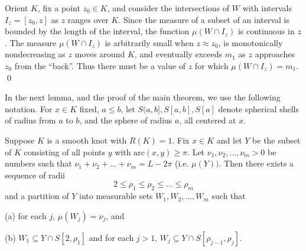 \documentclass{elsart}
\begin{document}
\begin{pf} 
Orient $K$, fix a point $z_0 \in K$, and
consider the intersections of $W$ with intervals
 $I_z =[z_0,z]$ as $z$ ranges over $K$.  
Since the measure of a subset of an 
interval is bounded by the length of the interval,
the function
$\mu(W\cap I_z)$ is continuous in $z$. 
The
measure $\mu(W\cap I_z)$ is arbitrarily small when
$z \approx z_0$, is monotonically
nondecreasing as $z$ moves around $K$, and
eventually exceeds $m_1$ as $z$ approaches $z_0$
from the ``back''.  
Thus there must be a value of $z$
for which $\mu(W\cap I_z) = m_1$. 
\qed
\end{pf}

In the next lemma, and the proof of the main theorem, we
use the following notation.
For $x\in K$ fixed, $a \leq b$, let $S(a,b], S[a,b], S[a]
$ denote spherical shells of radius from $a$ to $b$, and
the sphere of radius $a$, all centered at $x$. 

\begin{lem}
\label{ConstructWj}
Suppose $K$ is a smooth knot with $R(K)=1$.
Fix $x \in K$ and let $Y$ be the subset of $K$ consisting
of all points $y$ with $\mathrm{arc}(x,y) \geq \pi$. 
Let $\nu_1 ,\nu_2, \dots ,\nu_m > 0$ be numbers such
that {$\nu_1 +\nu_2 + \dots +\nu_m =
L-2\pi$} (i.e.{} $\mu (Y))$.  Then there exists a sequence
of radii
$$2 \leq \rho_1 \leq \rho_2 \leq \dots \leq \rho_m$$
and a partition of $Y$ into measurable sets 
$W_1 , W_2 ,\dots ,W_m$
such that  

(a) for each $j$, $\mu(W_j) = \nu_j$, and

(b) $W_1\subseteq Y\cap S[2,\rho_1]$ and
for each $j>1$, $W_j \subseteq Y\cap
S[\rho_{j-1},\rho_j]$.
\end{lem}
\end{document}
